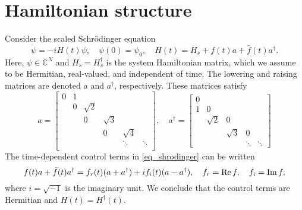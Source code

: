 \documentclass[11pt]{article}
\begin{document}



\section{Hamiltonian structure}
Consider the scaled Schr\"odinger equation
\begin{equation}\label{eq_shrodinger}
\dot{\psi} = -i H(t) \psi,\quad \psi(0) = \psi_0,\quad H(t) = H_s + f(t)a + \bar{f}(t)a^\dag.
\end{equation}
Here, $\psi \in\mathbb{C}^N$ and $H_s = H_s^\dag$ is the system Hamiltonian matrix, which we assume to
be  Hermitian, real-valued, and independent of time. The lowering and raising matrices are denoted
$a$ and $a^\dag$, respectively. These matrices satisfy
\begin{equation}\label{eq_matrices}
%
a = \begin{bmatrix}
0 & 1 & & & &\\
 & 0 & \sqrt{2} & & &\\
&  & 0 & \sqrt{3} & &\\
& &  & 0 & \sqrt{4} & \\
& &  &  & \ddots & \ddots\\
\end{bmatrix},\quad
%
a^\dag = \begin{bmatrix}
0 &  & & &\\
1 & 0 & & &\\
&  \sqrt{2} & 0 &  &\\
& &  \sqrt{3} & 0 & \\
& &  & \ddots & \ddots
\end{bmatrix}
\end{equation}
The time-dependent control terms in \eqref{eq_shrodinger} can be written
\[
f(t)a + \bar{f}(t)a^\dag =
f_r(t) (a + a^\dag) + i f_i(t) ( a- a^\dag),\quad f_r = {\rm Re}\, f,\quad f_i={\rm Im}\, f,
\]
where $i=\sqrt{-1}$ is the imaginary unit. We conclude that the control terms are Hermitian and
$H(t) = H^\dag(t)$.
\end{document}
